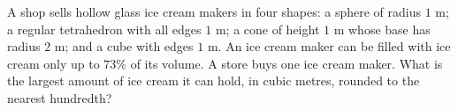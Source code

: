 A shop sells hollow glass ice cream makers in four shapes: a sphere of radius $1$ m; a regular tetrahedron with all edges $1$ m; a cone of height $1$ m whose base has radius $2$ m; and a cube with edges $1$ m. An ice cream maker can be filled with ice cream only up to $73\%$ of its volume. A store buys one ice cream maker. What is the largest amount of ice cream it can hold, in cubic metres, rounded to the nearest hundredth?
